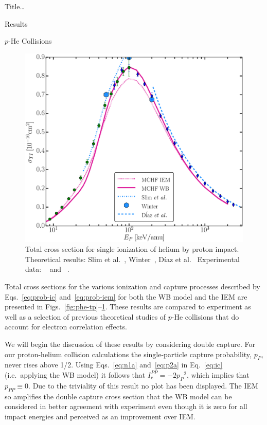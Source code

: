 \documentclass[letterpaper, 11 pt]{report}
\begin{document}
\begin{chapter}{ Title\dots \label{chap:p-he2p-he}}
\begin{section}{Results \label{sec:phe2p-res}}
\begin{subsection}{\texorpdfstring{$p$}{p}-He Collisions \label{sec:phe-res}}
\begin{figure}[ht]
\begin{minipage}{.49\linewidth}
               \centering
               \includegraphics[width = \linewidth]{./images/phe/phe-TI.eps}
               \caption[Total cross section for single ionization of helium by proton impact.]
                       {Total cross section for single ionization of helium by proton impact.
                        Theoretical results: Slim et al.~\cite{SHBF-91},
                        Winter~\cite{Winter-91}, D\'{i}az et al.~\cite{DMS-00}
                        Experimental data: {\color{OliveGreen}{$\bullet$}}~\cite{SG89} and
                        {\color{blue}{$\blacklozenge$}}~\cite{SG85}. \label{fig:phe-ti}}
            \end{minipage}
         \end{figure}

         Total cross sections for the various ionization and capture processes described by
         Eqs.~\eqref{eq:prob-ic} and~\eqref{eq:prob-iem} for both the WB model and the IEM are presented
         in Figs.~\ref{fig:phe-tp}--\ref{fig:phe-ti}. These results are compared to experiment as well
         as a selection of previous theoretical studies of $p$-He collisions that do account for
         electron correlation effects.

         We will begin the discussion of these results by considering double capture. For our
         proton-helium collision calculations the single-particle capture probability, $p_P$, never
         rises above 1/2. Using Eqs.~\eqref{eq:n1a} and~\eqref{eq:p2a} in Eq.~\eqref{eq:ic} (i.e.\
         applying the WB model) it follows that $I^{PP}_\mathrm{c} = -2 {p_P}^2$, which implies that
         $p_{PP} \equiv 0$. Due to the triviality of this result no plot has been displayed. The IEM so
         amplifies the double capture cross section that the WB model can be considered in better
         agreement with experiment even though it is zero for all impact energies and perceived as an
         improvement over IEM.


\end{subsection}
\end{section}
\end{chapter}
\end{document}
